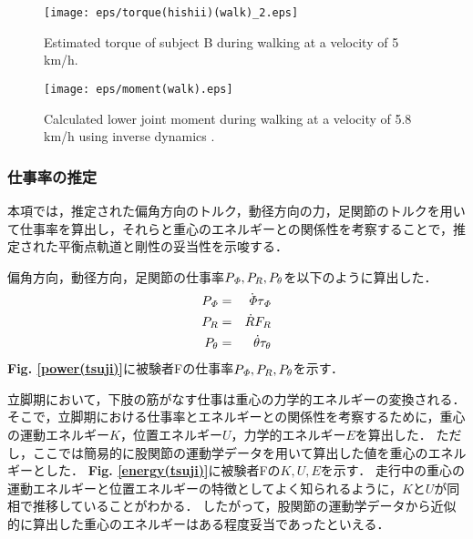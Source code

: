 %
\clearpage
%
\begin{figure}[!t]
 \begin{center}
  \texttt{[image: eps/torque(hishii)(walk)\_2.eps]}
  \caption{Estimated torque of subject B during walking at a velocity of 5 km/h.}
  \label{torque(hishii)(walk)}
 \end{center}
\end{figure}
%
\begin{figure}[!t]
 \begin{center}
  \texttt{[image: eps/moment(walk).eps]}
  \caption{Calculated lower joint moment during walking at a velocity of 5.8 km/h using inverse dynamics \cite{Eng1995}.}
  \label{moment(walk)}
 \end{center}
\end{figure}
%
\clearpage
\subsubsection{仕事率の推定}
本項では，推定された偏角方向のトルク，動径方向の力，足関節のトルクを用いて仕事率を算出し，それらと重心のエネルギーとの関係性を考察することで，推定された平衡点軌道と剛性の妥当性を示唆する．

偏角方向，動径方向，足関節の仕事率$P_{\it \Phi},P_R,P_{\theta}$を以下のように算出した．
\begin{eqnarray}
 \label{def_power1}
 P_{\it \Phi} &=& \dot{\it \Phi}\tau_{\it \Phi} \\
 \label{def_power2}
 P_R &=& \dot{R}F_{R} \\
 \label{def_power3}
 P_{\theta} &=& \dot{\theta}\tau_{\theta}
\end{eqnarray}
{\bf Fig. \ref{power(tsuji)}}に被験者Fの仕事率$P_{\it \Phi},P_R,P_{\theta}$を示す．

立脚期において，下肢の筋がなす仕事は重心の力学的エネルギーの変換される．
そこで，立脚期における仕事率とエネルギーとの関係性を考察するために，重心の運動エネルギー$K$，位置エネルギー$U$，力学的エネルギー$E$を算出した．
ただし，ここでは簡易的に股関節の運動学データを用いて算出した値を重心のエネルギーとした．
{\bf Fig. \ref{energy(tsuji)}}に被験者Fの$K,U,E$を示す．
走行中の重心の運動エネルギーと位置エネルギーの特徴としてよく知られるように，$K$と$U$が同相で推移していることがわかる．
したがって，股関節の運動学データから近似的に算出した重心のエネルギーはある程度妥当であったといえる．

